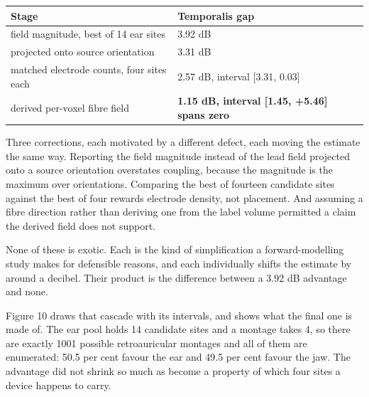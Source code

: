 \documentclass[manuscript,review,anonymous]{acmart}
\newcounter{none}
\begin{document}
{\def\LTcaptype{none} %
\begin{longtable}[]{@{}
  >{\raggedright\arraybackslash}p{}
  >{\raggedright\arraybackslash}p{}@{}}
\toprule\noalign{}
\begin{minipage}[b]{\linewidth}\raggedright
Stage
\end{minipage} & \begin{minipage}[b]{\linewidth}\raggedright
Temporalis gap
\end{minipage} \\
\midrule\noalign{}
\endhead
\bottomrule\noalign{}
\endlastfoot
field magnitude, best of 14 ear sites & \textminus{}3.92 dB \\
projected onto source orientation & \textminus{}3.31 dB \\
matched electrode counts, four sites each & \textminus{}2.57 dB, interval {[}\textminus{}3.31, \textminus{}0.03{]} \\
derived per-voxel fibre field & \textbf{\textminus{}1.15 dB, interval {[}\textminus{}1.45, +5.46{]} spans zero} \\
\end{longtable}
}

Three corrections, each motivated by a different defect, each moving the
estimate the same way. Reporting the field magnitude instead of the lead field
projected onto a source orientation overstates coupling, because the magnitude
is the maximum over orientations. Comparing the best of fourteen candidate sites
against the best of four rewards electrode density, not placement. And assuming
a fibre direction rather than deriving one from the label volume permitted a
claim the derived field does not support.

None of these is exotic. Each is the kind of simplification a forward-modelling
study makes for defensible reasons, and each individually shifts the estimate by
around a decibel. Their product is the difference between a 3.92 dB advantage and
none.

Figure 10 draws that cascade with its intervals, and shows what the final one is
made of. The ear pool holds 14 candidate sites and a montage takes 4, so there
are exactly 1001 possible retroauricular montages and all of them are
enumerated: 50.5 per cent favour the ear and 49.5 per cent favour the jaw. The
advantage did not shrink so much as become a property of which four sites a
device happens to carry.
\end{document}
